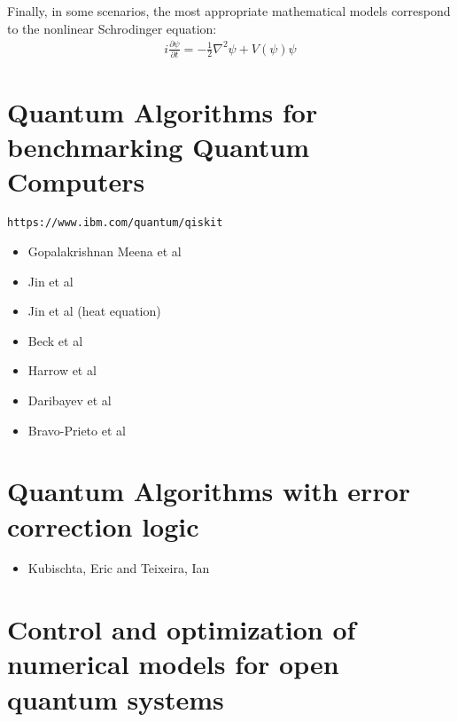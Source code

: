 \documentclass[]{article}
\begin{document}
Finally, in some scenarios, the most appropriate mathematical models 
correspond to the nonlinear Schrodinger equation:
\begin{eqnarray*}
i\frac{\partial \psi}{\partial t} = -\frac{1}{2} \nabla^2 \psi + V(\psi) \psi
\end{eqnarray*}


\begin{comment}
	1. PDE constrained optimization and control. QUANDARY
	  (PDE constraint is Schrodinger equation)
	  Anders Petersson and Stefanie Guenther
	2. Quantum algorithms for benchmarking quantum computers
	   Shi Jin, Antigoni Georgiadou
	3. Quantum error correction algorithms
	   Eric Kubischta
	4. Density functional theory
	   Lin Lin
\end{comment}

\section{Quantum Algorithms for benchmarking Quantum Computers}

\verb=https://www.ibm.com/quantum/qiskit=
\begin{itemize}
\item Gopalakrishnan Meena et al\cite{gopalakrishnan2024solving}
\item Jin et al\cite{doi:10.1137/23M1563451}
\item Jin et al (heat equation)\cite{jin2024quantum}
\item Beck et al\cite{beck2024integrating}
\item Harrow et al\cite{harrow2009quantum}
\item Daribayev et al\cite{daribayev2023implementation}
\item Bravo-Prieto et al\cite{bravo2023variational}
\end{itemize}

\section{Quantum Algorithms with error correction logic}

\begin{itemize}
\item Kubischta, Eric and Teixeira, Ian\cite{kubischta2023family}
\end{itemize}

\section{Control and optimization of numerical models for open
  quantum systems}
\end{document}
